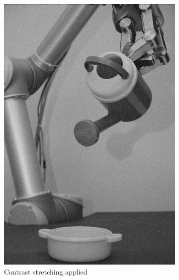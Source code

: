\begin{figure}[H]
\begin{subfigure}[b]{0.24\textwidth}
        \includegraphics[width=\textwidth]{img1/img_1_gaus_5_1_constrast_strech.png}
        \caption{Contrast stretching applied}
    \end{subfigure}
     \begin{subfigure}[b]{0.24\textwidth}

\end{subfigure}
\end{figure}
